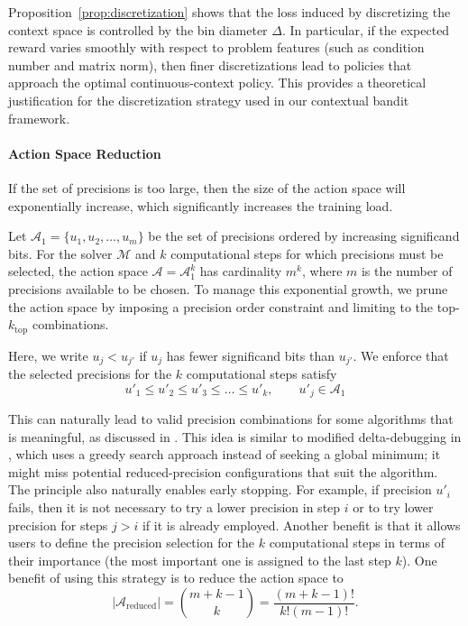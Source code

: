 \documentclass[Afour,sageh,times]{sagej}
\theoremstyle{plain}
\theoremstyle{definition}
\begin{document}
Proposition~\ref{prop:discretization} shows that the loss induced by discretizing the context space is controlled by the bin diameter $\Delta$. In particular, if the expected reward varies smoothly with respect to problem features (such as condition number and matrix norm), then finer discretizations lead to policies that approach the optimal continuous-context policy. This provides a theoretical justification for the discretization strategy used in our contextual bandit framework.


\paragraph{Action Space Reduction}
\label{subsec:greedy_strategy}

If the set of precisions is too large, then the size of the  action space will exponentially increase, which significantly increases the training load.

Let $\mathcal{A}_1 = \{ u_1, u_2, \ldots, u_m \}$ be the set of precisions ordered by increasing significand bits. For the solver $\mathcal{M}$ and $k$ computational steps for which precisions must be selected, the action space $\mathcal{A} = \mathcal{A}_1^k$ has cardinality $m^k$, where $m$ is the number of precisions available to be chosen. To manage this exponential growth, we prune the action space by imposing a precision order constraint and limiting to the top-$k_{\text{top}}$ combinations.

Here, we write $u_j < u_{j'}$ if $u_j$ has fewer significand bits than $u_{j'}$. We enforce that the selected precisions for the $k$ computational steps satisfy
\begin{equation}
\label{eq:precision_constraint}
u'_1 \leq u'_2 \leq u'_3 \leq \ldots  \leq u'_k, \qquad u'_j \in \mathcal{A}_1
\end{equation}


This can naturally lead to valid precision combinations for some algorithms that is meaningful, as discussed in \cite{vi22}.
This idea is similar to modified delta-debugging in \cite{6877460}, which uses a greedy search approach instead of seeking a global minimum; it might miss potential reduced-precision configurations that suit the algorithm. The principle also naturally enables early stopping. For example, if precision $u'_i$ fails, then it is not necessary to try a lower precision in step $i$ or to try lower precision for steps $j > i$ if it is already employed. Another benefit is that it allows users to define the precision selection for the $k$ computational steps in terms of their importance (the most important one is assigned to the last step $k$). One benefit of using this strategy is to reduce the action space to
\begin{equation}
\label{eq:reduced_action_space}
|\mathcal{A}_{\text{reduced}}| = \binom{m + k - 1}{k} = \frac{(m+k-1)!}{k!(m-1)!}.
\end{equation}
\end{document}
